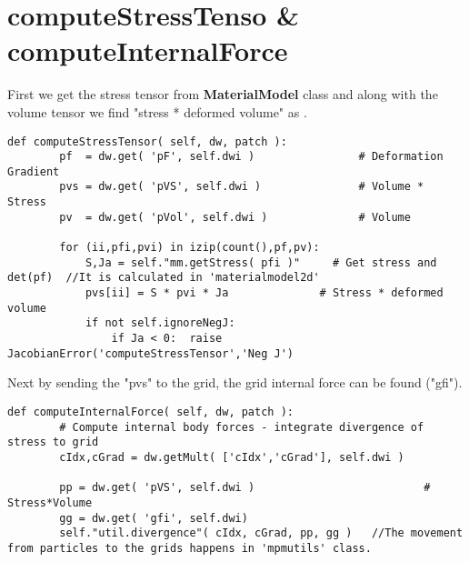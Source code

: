 \documentclass[11pt,fleqn]{book} %
\begin{document}
\section{ computeStressTenso \&  computeInternalForce}
First we get the stress tensor from \textbf{MaterialModel} class and along with the volume tensor we find "stress * deformed volume" as . 
\begin{lstlisting}
def computeStressTensor( self, dw, patch ):    
        pf  = dw.get( 'pF', self.dwi )                # Deformation Gradient
        pvs = dw.get( 'pVS', self.dwi )               # Volume * Stress
        pv  = dw.get( 'pVol', self.dwi )              # Volume
        
        for (ii,pfi,pvi) in izip(count(),pf,pv):
            S,Ja = self."mm.getStress( pfi )"     # Get stress and det(pf)  //It is calculated in 'materialmodel2d'
            pvs[ii] = S * pvi * Ja              # Stress * deformed volume     
            if not self.ignoreNegJ:
                if Ja < 0:  raise JacobianError('computeStressTensor','Neg J')      
\end{lstlisting}
Next by sending the "pvs" to the grid, the grid internal force can be found ("gfi").
\begin{lstlisting}
def computeInternalForce( self, dw, patch ):  
        # Compute internal body forces - integrate divergence of stress to grid
        cIdx,cGrad = dw.getMult( ['cIdx','cGrad'], self.dwi )

        pp = dw.get( 'pVS', self.dwi )                          # Stress*Volume
        gg = dw.get( 'gfi', self.dwi)
        self."util.divergence"( cIdx, cGrad, pp, gg )   //The movement from particles to the grids happens in 'mpmutils' class.
\end{lstlisting}
\end{document}
